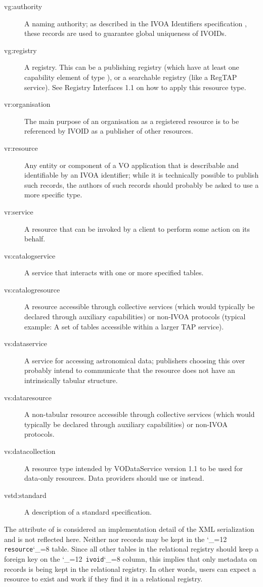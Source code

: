 \documentclass[11pt,a4paper]{ivoa}
\makeatletter
\def\rtent#1{\texttt{\color{rtcolor}\verb|#1|}}
\def\makeunderscoreletter{\catcode`\_=12}
\def\makeunderscoresubscript{\catcode`\_=8}
\def\rtent{\makeunderscoreletter\relax\rt@nt}
\def\rt@nt#1{\texttt{\color{rtcolor} #1}\makeunderscoresubscript{}}
\makeatother
\begin{document}
\begin{description}
\item[vg:authority]A naming authority; as described in the IVOA
Identifiers specification \citep{2016ivoa.spec.0523D}, these records
are used to guarantee global uniqueness of IVOIDs.
\item[vg:registry]A registry.  This can be a publishing registry (which
have at least one capability element of type ), or a
searchable registry (like a RegTAP service).  See Registry Interfaces
1.1 on how to apply this resource type.
\item[vr:organisation]The main purpose of an organisation as a registered resource is to
be referenced by IVOID as a publisher of other resources.
\item[vr:resource]Any entity or component of a VO application that is describable and
identifiable by an IVOA identifier; while it is technically possible to
publish such records, the authors of such records should probably be
asked to use a more specific type.
\item[vr:service]A resource that can be invoked by a client to perform some action on
its behalf.
\item[vs:catalogservice]A service that interacts with one or more
specified tables.
\item[vs:catalogresource] A resource accessible through collective services
(which would typically be declared through auxiliary capabilities) or non-IVOA protocols
(typical example: A set of tables accessible within a larger TAP
service).
\item[vs:dataservice]A service for accessing astronomical data; publishers choosing
this over  probably intend to communicate
that the resource does not have an intrinsically tabular structure.
\item[vs:dataresource] A non-tabular resource accessible through collective
services (which would typically be declared through auxiliary
capabilities) or non-IVOA protocols.
\item[vs:datacollection] A resource type intended by VODataService
version 1.1 to be used for data-only resources.  Data providers should
use  or  instead.
\item[vstd:standard]A description of a standard specification.
\end{description}

The  attribute of  is
considered an implementation detail of the XML serialization and is not
reflected here.  Neither  nor 
records may be kept in the \rtent{resource} table.  Since all
other tables in the relational registry should keep a foreign key on the
\rtent{ivoid} column, this implies that only metadata on
 records
is being kept in the relational registry. In other words, users can
expect a resource to exist and work if they find it in a relational
registry.
\end{document}

